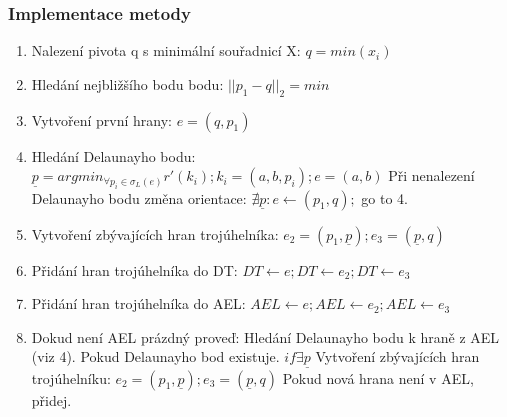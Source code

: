 \documentclass[a4paper, 12pt]{article}
\begin{document}
\subsubsection{Implementace metody}
\begin{enumerate}
\item Nalezení pivota q s minimální souřadnicí X:  $ q = min(x_i) $ 
\item Hledání nejbližšího bodu bodu: $ ||p_1 - q||_2 = min  $
\item Vytvoření první hrany: $ e = (q, p_1) $ 
\item Hledání Delaunayho bodu: $ \underline{p} = argmin_{\forall p_i \in \sigma_L (e)} r'(k_i); k_i = (a, b, p_i); e = (a, b)$ 
\subitem Při nenalezení Delaunayho bodu změna orientace: $ \nexists \underline{p} : e \leftarrow (p_1, q);$ go to 4. 
\item Vytvoření zbývajících hran trojúhelníka: $ e_2 = (p_1,  \underline{p}); e_3 = ( \underline{p} , q) $
\item Přidání hran trojúhelníka do DT:  $ DT \leftarrow e; DT \leftarrow e_2; DT \leftarrow e_3  $  
\item Přidání hran trojúhelníka do AEL:  $ AEL \leftarrow e; AEL \leftarrow e_2; AEL \leftarrow e_3  $  
\item Dokud není AEL prázdný proveď:
\subitem Hledání Delaunayho bodu k hraně z AEL (viz 4).
\subitem Pokud Delaunayho bod existuje. $ if \exists  \underline{p}$
\subsubitem Vytvoření zbývajících hran trojúhelníku:   $ e_2 = (p_1,  \underline{p}); e_3 = ( \underline{p} , q) $
\subsubitem Pokud nová hrana není v AEL, přidej.
\end{enumerate}
\end{document}

